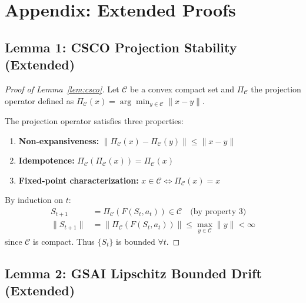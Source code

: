 \section{Appendix: Extended Proofs}

\subsection{Lemma 1: CSCO Projection Stability (Extended)}

\begin{proof}[Proof of Lemma~\ref{lem:csco}]
Let $\mathcal{C}$ be a convex compact set and $\Pi_{\mathcal{C}}$ the
projection operator defined as $\Pi_{\mathcal{C}}(x) = \arg\min_{y\in\mathcal{C}}
\|x-y\|$.

The projection operator satisfies three properties:
\begin{enumerate}
    \item \textbf{Non-expansiveness:} $\|\Pi_{\mathcal{C}}(x) - \Pi_{\mathcal{C}}(y)\| \leq \|x-y\|$
    \item \textbf{Idempotence:} $\Pi_{\mathcal{C}}(\Pi_{\mathcal{C}}(x)) = \Pi_{\mathcal{C}}(x)$
    \item \textbf{Fixed-point characterization:} $x \in \mathcal{C} \iff \Pi_{\mathcal{C}}(x) = x$
\end{enumerate}

By induction on $t$:
\begin{align*}
    S_{t+1} &= \Pi_{\mathcal{C}}(F(S_t, a_t)) \in \mathcal{C} \quad \text{(by property 3)} \\
    \|S_{t+1}\| &= \|\Pi_{\mathcal{C}}(F(S_t, a_t))\| \leq \max_{y\in\mathcal{C}} \|y\| < \infty
\end{align*}
since $\mathcal{C}$ is compact.
Thus $\{S_t\}$ is bounded $\forall t$.
\end{proof}

\subsection{Lemma 2: GSAI Lipschitz Bounded Drift (Extended)}


